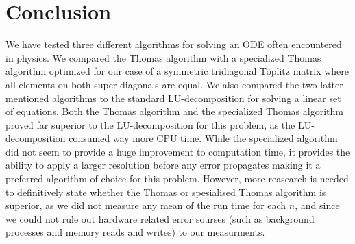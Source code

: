 \documentclass[twocolumn]{aastex62}
\begin{document}
\section{Conclusion} \label{sec:conclusion}
We have tested three different algorithms for solving an ODE often encountered in physics. We compared the Thomas algorithm with a specialized Thomas algorithm optimized for our case of a symmetric tridiagonal Töplitz matrix where all elements on both super-diagonals are equal. We also compared the two latter mentioned algorithms to the standard LU-decomposition for solving a linear set of equations. Both the Thomas algorithm and the specialized Thomas algorithm proved far superior to the LU-decomposition for this problem, as the LU-decomposition consumed way more CPU time. While the specialized algorithm did not seem to provide a huge improvement to computation time, it provides the ability to apply a larger resolution before any error propagates making it a preferred algorithm of choice for this problem. However, more reasearch is needed to definitively state whether the Thomas or spesialised Thomas algorithm is superior, as we did not measure any mean of the run time for each $n$, and since we could not rule out hardware related error sourses (such as background processes and memory reads and writes) to our measurments.
\nocite{Jensen:2019}



\end{document}
